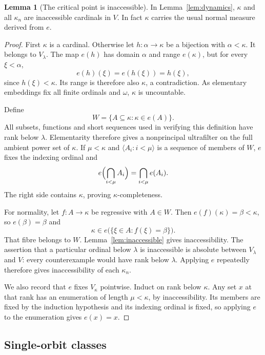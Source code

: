 \documentclass[11pt,letterpaper]{article}
\theoremstyle{definition}
\newtheorem{lemma}[definition]{Lemma}
\newcommand{\seq}[1]{\langle #1\rangle}
\begin{document}
\begin{lemma}[The critical point is inaccessible]\label{lem:criticalmeasure}
In Lemma~\ref{lem:dynamics}, $\kappa$ and all $\kappa_n$ are inaccessible cardinals in $V$. In fact $\kappa$ carries the usual normal measure derived from $e$.
\end{lemma}

\begin{proof}
First $\kappa$ is a cardinal. Otherwise let $h:\alpha\to\kappa$ be a bijection with $\alpha<\kappa$. It belongs to $V_\lambda$. The map $e(h)$ has domain $\alpha$ and range $e(\kappa)$, but for every $\xi<\alpha$,
\[
 e(h)(\xi)=e(h(\xi))=h(\xi),
\]
since $h(\xi)<\kappa$. Its range is therefore also $\kappa$, a contradiction. As elementary embeddings fix all finite ordinals and $\omega$, $\kappa$ is uncountable.

Define
\[
                     W=\{A\subseteq\kappa:\kappa\in e(A)\}.
\]
All subsets, functions and short sequences used in verifying this definition have rank below $\lambda$. Elementarity therefore gives a nonprincipal ultrafilter on the full ambient power set of $\kappa$. If $\mu<\kappa$ and $\seq{A_i:i<\mu}$ is a sequence of members of $W$, $e$ fixes the indexing ordinal and
\[
 e\Bigl(\bigcap_{i<\mu}A_i\Bigr)=\bigcap_{i<\mu}e(A_i).
\]
The right side contains $\kappa$, proving $\kappa$-completeness.

For normality, let $f:A\to\kappa$ be regressive with $A\in W$. Then $e(f)(\kappa)=\beta<\kappa$, so $e(\beta)=\beta$ and
\[
       \kappa\in e\bigl(\{\xi\in A:f(\xi)=\beta\}\bigr).
\]
That fibre belongs to $W$. Lemma~\ref{lem:inaccessible} gives inaccessibility. The assertion that a particular ordinal below $\lambda$ is inaccessible is absolute between $V_\lambda$ and $V$: every counterexample would have rank below $\lambda$. Applying $e$ repeatedly therefore gives inaccessibility of each $\kappa_n$.

We also record that $e$ fixes $V_\kappa$ pointwise. Induct on rank below $\kappa$. Any set $x$ at that rank has an enumeration of length $\mu<\kappa$, by inaccessibility. Its members are fixed by the induction hypothesis and its indexing ordinal is fixed, so applying $e$ to the enumeration gives $e(x)=x$.
\end{proof}

\subsection{Single-orbit classes}
\end{document}
